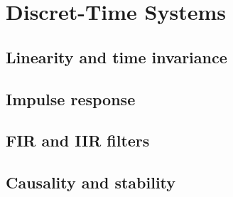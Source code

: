\section{Discret-Time Systems}
\subsection{Linearity and time invariance}
\subsection{Impulse response}
\subsection{FIR and IIR filters}
\subsection{Causality and stability}